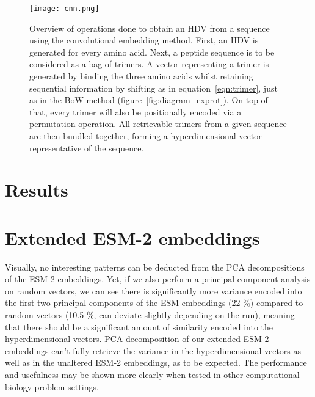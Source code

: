 \begin{figure}[h]
    \centering
    \texttt{[image: cnn.png]}
    \caption{Overview of operations done to obtain an HDV from a sequence using the convolutional embedding method. First, an HDV is generated for every amino acid. Next, a peptide sequence is to be considered as a bag of trimers. A vector representing a trimer is generated by binding the three amino acids whilst retaining sequential information by shifting as in equation~\ref{eqn:trimer}, just as in the BoW-method (figure~\ref{fig:diagram_exprot}). On top of that, every trimer will also be positionally encoded via a permutation operation. All retrievable trimers from a given sequence are then bundled together, forming a hyperdimensional vector representative of the sequence.}
    \label{fig:cnn}
\end{figure}

\section{Results}
\section*{Extended ESM-2 embeddings}
Visually, no interesting patterns can be deducted from the PCA decompositions of the ESM-2 embeddings. Yet, if we also perform a principal component analysis on random vectors, we can see there is significantly more variance encoded into the first two principal components of the ESM embeddings (22 \%) compared to random vectors (10.5 \%, can deviate slightly depending on the run), meaning that there should be a significant amount of similarity encoded into the hyperdimensional vectors. PCA decomposition of our extended ESM-2 embeddings can't fully retrieve the variance in the hyperdimensional vectors as well as in the unaltered ESM-2 embeddings, as to be expected. The performance and usefulness may be shown more clearly when tested in other computational biology problem settings.

